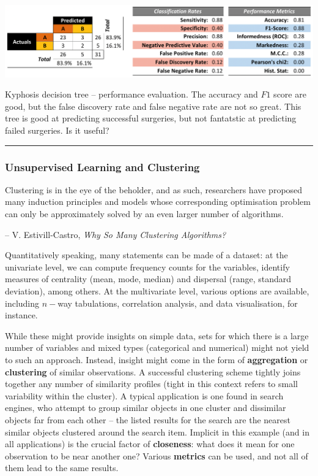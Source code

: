 \afterpage{\FloatBarrier}
 \begin{table}[!t]
\centering
\includegraphics[width=\textwidth]{images/DSML/kyphosis4.png}
\caption[\small Kyphosis decision tree -- performance evaluation]{\small Kyphosis decision tree -- performance evaluation. The accuracy and $F1$ score are good, but the false discovery rate and false negative rate are not so great. This tree is good at predicting successful surgeries, but not fantatstic at predicting failed surgeries. Is it useful?}\hrule \label{fig:class9}
\end{table}
\afterpage{\FloatBarrier}
\subsubsection{Unsupervised Learning and Clustering}
\begin{tcolorbox}[title=A Never-Ending Story]
Clustering is in the eye of the beholder, and as such, researchers have proposed many induction principles and models whose corresponding optimisation problem can only be approximately solved by an even larger number of algorithms. \\[-0.6cm]
\begin{flushright}
-- V. Estivill-Castro, \textit{Why So Many Clustering Algorithms?}
\end{flushright}
\end{tcolorbox}
\noindent Quantitatively speaking, many statements can be made of a dataset: at the univariate level, we can compute frequency counts for the variables, identify measures of centrality (mean, mode, median) and dispersal (range, standard deviation), among others. At the multivariate level, various options are available, including $n-$way tabulations, correlation analysis, and data visualisation, for instance. 

While these might provide insights on simple data, sets for which there is a large number of variables and mixed types (categorical and numerical) might not yield to such an approach. Instead, insight might come in the form of \textbf{aggregation} or \textbf{clustering} of similar observations. A successful clustering scheme tightly joins together any number of similarity profiles (tight in this context refers to small variability within the cluster). A typical application is one found in search engines, who attempt to group similar objects in one cluster and dissimilar objects far from each other -- the listed results for the search are the nearest similar objects clustered around the search item. Implicit in this example (and in all applications) is the crucial factor of \textbf{closeness}: what does it mean for one observation to be near another one? Various \textbf{metrics} can be used, and not all of them lead to the same results. 

